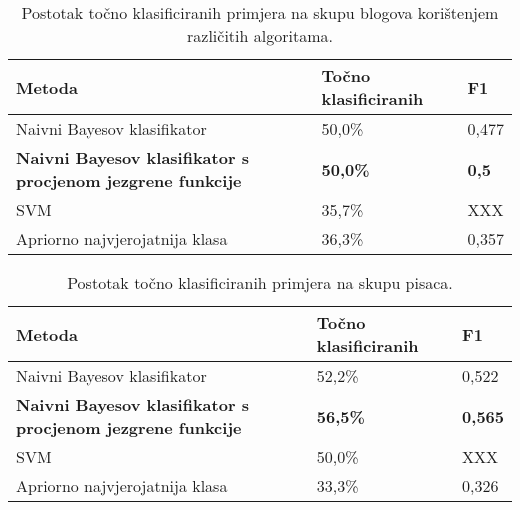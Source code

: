 \documentclass[10pt, a4paper]{article}
\begin{document}
\begin{table*}
\caption{Postotak točno klasificiranih primjera  na skupu blogova korištenjem različitih algoritama.}
\label{tab:rezultati}
\begin{center}
\begin{tabular}{lll}
\toprule
Metoda & Točno klasificiranih & F1 \\
\midrule
Naivni Bayesov klasifikator & 50,0\% & 0,477\\
 \textbf{Naivni Bayesov klasifikator s procjenom jezgrene funkcije}   & \textbf{ 50,0\%} &  \textbf{0,5}\\
SVM   & 35,7\% & XXX\\
Apriorno najvjerojatnija klasa & 36,3\% & 0,357\\
\bottomrule
\end{tabular}
\end{center}
\end{table*}
\begin{table*}


\caption{Postotak točno klasificiranih primjera na skupu pisaca. }
\begin{center}
\begin{tabular}{lll}
\toprule
Metoda & Točno klasificiranih & F1\\
\midrule
Naivni Bayesov klasifikator & 52,2\% & 0,522\\
 \textbf{Naivni Bayesov klasifikator s procjenom jezgrene funkcije} &  \textbf{56,5\%} & \textbf{0,565}\\
SVM & 50,0\% & XXX\\
Apriorno najvjerojatnija klasa & 33,3\% & 0,326\\
\bottomrule
\end{tabular}
\end{center}
\end{table*}
\end{document}
